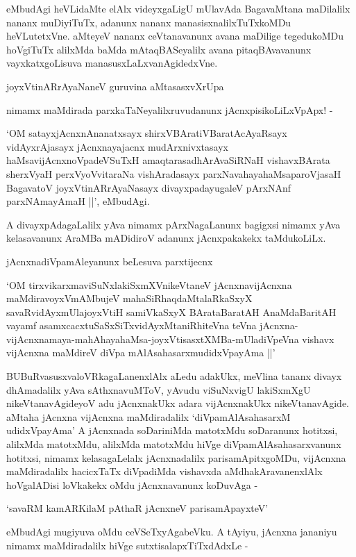 eMbudAgi heVLidaMte elAlx videyxgaLigU mUlavAda BagavaMtana maDilalilx nananx muDiyiTuTx, adanunx nananx manasisxnalilxTuTxkoMDu heVLutetxVne. aMteyeV nananx ceVtanavanunx avana maDilige tegedukoMDu hoVgiTuTx alilxMda baMda mAtaqBASeyalilx avana pitaqBAvavanunx vayxkatxgoLisuva manasusxLaLxvanAgidedxVne.

\begin{shloka}
joyxVtinARrAyaNaneV guruvina aMtasasxvXrUpa
\end{shloka}

nimamx maMdirada parxkaTaNeyalilxruvudanunx jAcnxpisikoLiLxVpApx! - 

`OM satayxjAcnxnAnanatxsayx shirxVBAratiVBaratAcAyaRsayx vidAyxrAjasayx jAcnxnayajacnx mudArxnivxtasayx haMsavijAcnxnoVpadeVSuTxH amaqtarasadhArAvaSiRNaH vishavxBArata sherxVyaH perxVyoVvitaraNa vishAradasayx parxNavahayahaMsaparoVjasaH BagavatoV joyxVtinARrAyaNasayx divayxpadayugaleV pArxNAnf parxNAmayAmaH ||', eMbudAgi.

A divayxpAdagaLalilx yAva nimamx pArxNagaLanunx bagigxsi nimamx yAva kelasavanunx AraMBa mADidiroV adanunx jAcnxpakakekx taMdukoLiLx.

jAcnxnadiVpamAleyanunx beLesuva parxtijecnx

`OM tirxvikarxmaviSuNxlakiSxmXVnikeVtaneV jAcnxnavijAcnxna maMdiravoyxVmAMbujeV mahaSiRhaqdaMtalaRkaSxyX savaRvidAyxmUlajoyxVtiH samiVkaSxyX BArataBaratAH AnaMdaBaritAH vayamf asamxcacxtuSaSxSiTxvidAyxMtaniRhiteVna teVna jAcnxna-vijAcnxnamaya-mahAhayahaMsa-joyxVtisasxtXMBa-mUladiVpeVna vishavx vijAcnxna maMdireV diVpa mAlAsahasarxmudidxVpayAma ||'

BUBuRvasusxvaloVRkagaLanenxlAlx aLedu adakUkx, meVlina tananx divayx dhAmadalilx yAva sAthxnavuMToV, yAvudu viSuNxvigU lakiSxmXgU nikeVtanavAgideyoV adu jAcnxnakUkx adara vijAcnxnakUkx nikeVtanavAgide. aMtaha jAcnxna vijAcnxna maMdiradalilx `diVpamAlAsahasarxM udidxVpayAma' A jAcnxnada soDariniMda matotxMdu soDaranunx hotitxsi, alilxMda matotxMdu, alilxMda matotxMdu hiVge diVpamAlAsahasarxvanunx hotitxsi, nimamx kelasagaLelalx jAcnxnadalilx parisamApitxgoMDu, vijAcnxna maMdiradalilx hacicxTaTx diVpadiMda vishavxda aMdhakAravanenxlAlx hoVgalADisi loVkakekx oMdu jAcnxnavanunx koDuvAga - 

\begin{shloka}
`savaRM kamARKilaM pAthaR jAcnxneV parisamApayxteV'
\end{shloka}

eMbudAgi mugiyuva oMdu ceVSeTxyAgabeVku. A tAyiyu, jAcnxna jananiyu nimamx maMdiradalilx hiVge sutxtisalapxTiTxdAdxLe -

